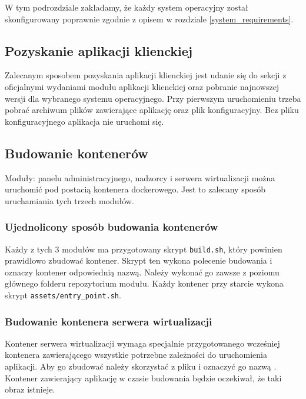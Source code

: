 \documentclass[../opis-rozwiazania.tex]{subfiles}
\begin{document}
\label{system_startup}

W tym podrozdziale zakładamy, że każdy system operacyjny został skonfigurowany poprawnie zgodnie z opisem w rozdziale \ref{system_requirements}.

\subsection{Pozyskanie aplikacji klienckiej}
\label{system_startup.client_obtaining}
Zalecanym sposobem pozyskania aplikacji klienckiej jest udanie się do sekcji z oficjalnymi wydaniami \parencite{ocd-client-releases} modułu aplikacji klienckiej oraz pobranie najnowszej wersji dla wybranego systemu operacyjnego.
Przy pierwszym uruchomieniu trzeba pobrać archiwum plików zawierające aplikację oraz plik konfiguracyjny.
Bez pliku konfiguracyjnego aplikacja nie uruchomi się.

\subsection{Budowanie kontenerów}
\label{system_startup.containers}

Moduły: panelu administracyjnego, nadzorcy i serwera wirtualizacji można uruchomić pod postacią kontenera dockerowego.
Jest to zalecany sposób uruchamiania tych trzech modułów.

\subsubsection{Ujednolicony sposób budowania kontenerów}
Każdy z tych 3 modułów ma przygotowany skrypt \texttt{build.sh}, który powinien prawidłowo zbudować kontener.
Skrypt ten wykona polecenie budowania i oznaczy kontener odpowiednią nazwą.
Należy wykonać go zawsze z poziomu głównego folderu repozytorium modułu.
Każdy kontener przy starcie wykona skrypt \texttt{assets/entry\_point.sh}.

\subsubsection{Budowanie kontenera serwera wirtualizacji}
Kontener serwera wirtualizacji wymaga specjalnie przygotowanego wcześniej kontenera zawierającego wszystkie potrzebne zależności do uruchomienia aplikacji.
Aby go zbudować należy skorzystać z pliku \texttt{} i oznaczyć go nazwą \texttt{}.
Kontener zawierający aplikację w czasie budowania będzie oczekiwał, że taki obraz istnieje.
\end{document}
